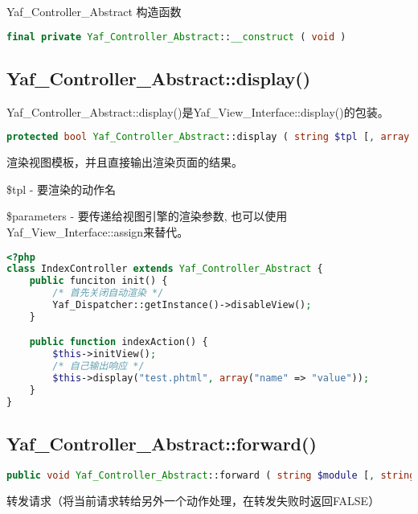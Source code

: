 Yaf\_Controller\_Abstract 构造函数


\begin{lstlisting}[language=PHP]
final private Yaf_Controller_Abstract::__construct ( void )
\end{lstlisting}


\subsection{Yaf\_Controller\_Abstract::display()}

Yaf\_Controller\_Abstract::display()是Yaf\_View\_Interface::display()的包装。

\begin{lstlisting}[language=PHP]
protected bool Yaf_Controller_Abstract::display ( string $tpl [, array $parameters ] )
\end{lstlisting}

渲染视图模板，并且直接输出渲染页面的结果。


\begin{compactitem}
\item \$tpl - 要渲染的动作名
\item \$parameters - 要传递给视图引擎的渲染参数, 也可以使用Yaf\_View\_Interface::assign来替代。
\end{compactitem}






\begin{lstlisting}[language=PHP]
<?php
class IndexController extends Yaf_Controller_Abstract {
    public funciton init() {
        /* 首先关闭自动渲染 */
        Yaf_Dispatcher::getInstance()->disableView();
    }

    public function indexAction() {
        $this->initView();
        /* 自己输出响应 */
        $this->display("test.phtml", array("name" => "value"));
    }
}
\end{lstlisting}

\subsection{Yaf\_Controller\_Abstract::forward()}

\begin{lstlisting}[language=PHP]
public void Yaf_Controller_Abstract::forward ( string $module [, string $controller [, string $action [, array $paramters ]]] )
\end{lstlisting}

转发请求（将当前请求转给另外一个动作处理，在转发失败时返回FALSE）

